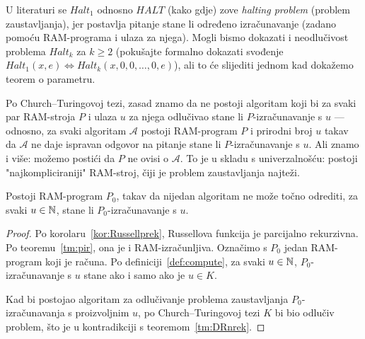 U literaturi se $Halt_1$ odnosno $HALT$ (kako gdje) zove \emph{halting problem} (problem zaustavljanja), jer postavlja pitanje stane li određeno izračunavanje (zadano pomoću RAM-programa i ulaza za njega). Mogli bismo dokazati i neodlučivost problema $Halt_k$ za $k\ge 2$ (pokušajte formalno dokazati svođenje $Halt_1(x,e)\Leftrightarrow Halt_k(x,0,0,\dotsc,0,e)$), ali to će slijediti jednom kad dokažemo teorem o parametru.

Po Church--\!Turingovoj tezi, zasad znamo da ne postoji algoritam koji bi za svaki par RAM-stroja $P$ i ulaza $u$ za njega odlučivao stane li $P$-izračunavanje s $u$ --- odnosno, za svaki algoritam $\mathcal A$ postoji RAM-program $P$ i prirodni broj $u$ takav da $\mathcal A$ ne daje ispravan odgovor na pitanje stane li $P$-izračunavanje s $u$. Ali znamo i više: možemo postići da $P$ ne ovisi o $\mathcal A$. To je u skladu s univerzalnošću: postoji "najkompliciraniji" RAM-stroj, čiji je problem zaustavljanja najteži.

\begin{korolar}[{name=[neodlučivost problema zaustavljanja za jedan fiksni RAM-stroj]}]\label{kor:RAMhaltnodl}
Postoji RAM-program $P_0$, takav da nijedan algoritam ne može točno odrediti, za svaki $u\in{\mathbb N}$, stane li $P_0$-izračunavanje s $u$.
\end{korolar}
\begin{proof}
Po korolaru~\ref{kor:Russellprek}, Russellova funkcija je parcijalno rekurzivna. Po teoremu~\ref{tm:pir}, ona je i RAM-izračunljiva. Označimo s $P_0$ jedan RAM-program koji je računa. Po definiciji~\ref{def:compute}, za svaki $u\in{\mathbb N}$, $P_0$-izračunavanje s $u$ stane ako i samo ako je $u\in K$.

Kad bi postojao algoritam za odlučivanje problema zaustavljanja $P_0$-izračunavanja s proizvoljnim $u$, po Church--\!Turingovoj tezi $K$ bi bio odlučiv problem, što je u kontradikciji s teoremom~\ref{tm:DRnrek}.
\end{proof}

